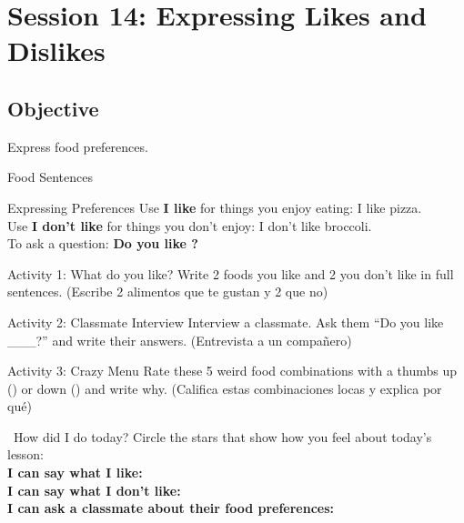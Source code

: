 \section*{Session 14: Expressing Likes and Dislikes}

\subsection*{Objective}
Express food preferences.

\begin{vocabcard}{Food Sentences}
\end{vocabcard}

\begin{grammartip}{Expressing Preferences}
  Use \textbf{I like} for things you enjoy eating: I like pizza.\\
  Use \textbf{I don't like} for things you don't enjoy: I don't like broccoli.\\
  To ask a question: \textbf{Do you like \underline{\hspace{2cm}}?}
\end{grammartip}

\begin{activity}{Activity 1: What do you like?}
  Write 2 foods you like and 2 you don't like in full sentences. (Escribe 2 alimentos que te gustan y 2 que no)
  \writinglines[4]
\end{activity}

\begin{activity}{Activity 2: Classmate Interview}
  Interview a classmate. Ask them ``Do you like \_\_\_?'' and write their answers. (Entrevista a un compañero)
  \writinglines[4]
\end{activity}

\begin{activity}{Activity 3: Crazy Menu}
  Rate these 5 weird food combinations with a thumbs up () or down () and write why. (Califica estas combinaciones locas y explica por qué)
  \writinglines[5]
\end{activity}

\vspace{1em}
\begin{grammartip}{ \ How did I do today?}
  Circle the stars that show how you feel about today's lesson:\\[6pt]
  \textbf{I can say what I like:} \selfcheck[0] \\[4pt]
  \textbf{I can say what I don't like:} \selfcheck[0] \\[4pt]
  \textbf{I can ask a classmate about their food preferences:} \selfcheck[0]
\end{grammartip}
